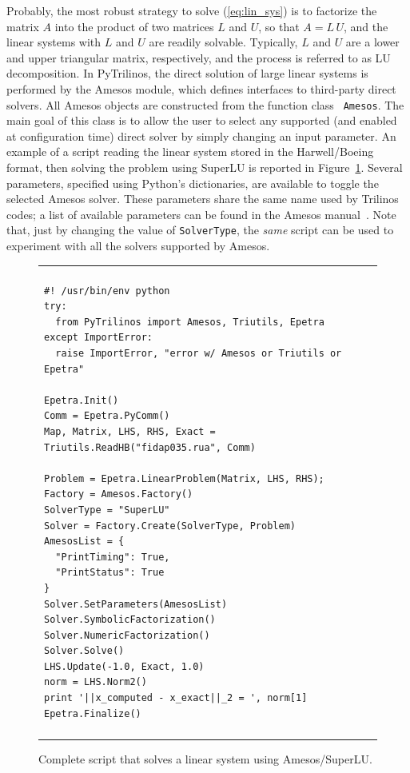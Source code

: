 \documentclass[10pt,relax]{SANDreport}
\begin{document}
Probably, the most robust strategy to solve (\ref{eq:lin_sys}) is to
factorize the matrix $A$ into the product of two matrices $L$ and
$U$, so that $A = L \, U$, and the linear systems with $L$ and $U$
are readily solvable. Typically, $L$ and $U$ are a lower and upper
triangular matrix, respectively, and the process is referred to as
LU decomposition. In PyTrilinos, the direct solution of large linear
systems is performed by the Amesos module, which defines interfaces
to third-party direct solvers. All Amesos objects are constructed
from the function class {\tt
  Amesos}.   The main goal of this class is to allow the user to select
any supported (and enabled at configuration time) direct solver by
simply changing an input parameter. An example of a script reading
the linear system stored in the Harwell/Boeing format, then solving
the problem using SuperLU is reported in Figure~\ref{fig:amesos}.
Several parameters, specified using Python's dictionaries, are
available to toggle the selected Amesos solver. These parameters
share the same name used by Trilinos codes; a list of available
parameters can be found in the Amesos
manual~\cite{Amesos-Reference-Guide}. Note that, just by changing
the value of \verb!SolverType!, the {\sl same} script can be used to
experiment with all the solvers supported by Amesos.

\begin{figure}
\begin{center}
\begin{tabular}{| p{12cm} |}
\hline
\\
\footnotesize
\begin{minipage}{11.5cm}
\begin{verbatim}
#! /usr/bin/env python
try:
  from PyTrilinos import Amesos, Triutils, Epetra
except ImportError:
  raise ImportError, "error w/ Amesos or Triutils or Epetra"

Epetra.Init()
Comm = Epetra.PyComm()
Map, Matrix, LHS, RHS, Exact = Triutils.ReadHB("fidap035.rua", Comm)

Problem = Epetra.LinearProblem(Matrix, LHS, RHS);
Factory = Amesos.Factory()
SolverType = "SuperLU"
Solver = Factory.Create(SolverType, Problem)
AmesosList = {
  "PrintTiming": True,
  "PrintStatus": True
}
Solver.SetParameters(AmesosList)
Solver.SymbolicFactorization()
Solver.NumericFactorization()
Solver.Solve()
LHS.Update(-1.0, Exact, 1.0)
norm = LHS.Norm2()
print '||x_computed - x_exact||_2 = ', norm[1]
Epetra.Finalize()
\end{verbatim}
\end{minipage}
\\
\\
\hline
\end{tabular}
\caption{Complete script that solves a linear system using Amesos/SuperLU.}
\label{fig:amesos}
\end{center}
\end{figure}
\end{document}
